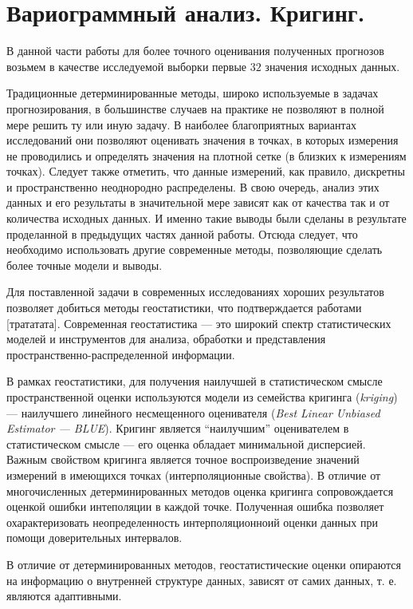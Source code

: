 
\section{Вариограммный анализ. Кригинг.} %
\label{sec:_variogram}

В данной части работы для более точного оценивания полученных прогнозов возьмем в качестве исследуемой выборки первые $32$ значения исходных данных.

Традиционные детерминированные методы, широко используемые в задачах прогнозирования, в большинстве случаев на практике не позволяют в полной мере решить ту или иную задачу. В наиболее благоприятных вариантах исследований они позволяют оценивать значения в точках, в которых измерения не проводились и определять значения на плотной сетке (в близких к измерениям точках). Следует также отметить, что данные измерений, как правило, дискретны и пространственно неоднородно распределены. В свою очередь, анализ этих данных и его результаты в значительной мере зависят как от качества так и от количества исходных данных. И именно такие выводы были сделаны в результате проделанной в предыдущих частях данной работы. Отсюда следует, что необходимо использовать другие современные методы, позволяющие сделать более точные модели и выводы.

Для поставленной задачи в современных исследованиях хороших результатов позволяет добиться методы геостатистики, что подтверждается работами [трататата]. Современная геостатистика --- это широкий спектр статистических моделей и инструментов для анализа, обработки и представления пространственно-распределенной информации.


В рамках геостатистики, для получения наилучшей в статистическом смысле пространственной оценки используются модели из семейства кригинга (\textit{kriging}) --- наилучшего линейного несмещенного оценивателя (\textit{Best Linear Unbiased Estimator --- BLUE}). Кригинг является ``наилучшим'' оценивателем в статистическом смысле --- его оценка обладает минимальной дисперсией. Важным свойством кригинга является точное воспроизведение значений измерений в имеющихся точках (интерполяционные свойства). В отличие от многочисленных детерминированных методов оценка кригинга сопровождается оценкой ошибки интеполяции в каждой точке. Полученная ошибка позволяет охарактеризовать неопределенность интерполяционноий оценки данных при помощи доверительных интервалов.

В отличие от детерминированных методов, геостатистические оценки опираются на информацию о внутренней структуре данных, зависят от самих данных, т. е. являются адаптивными.

